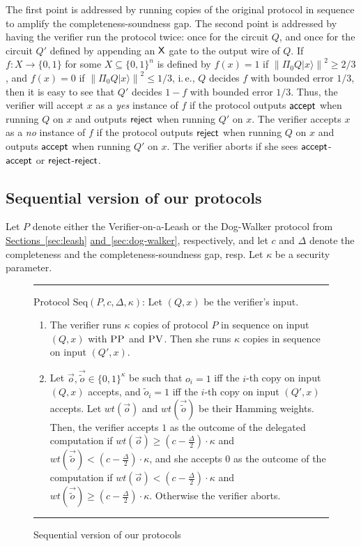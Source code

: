 \documentclass[11pt]{article}
\numberwithin{equation}{section}
\theoremstyle{definition}
\theoremstyle{plain}
\newcommand{\ie}{i.\,e.}
\newcommand{\expref}[2]{\hyperref[#2]{#1~\ref{#2}}}
\newcommand{\ket}[1]{|#1\rangle}
\newcommand{\norm}[1]{\left\|#1\right\|}
\newcommand{\pv}{\textsc{PV}}
\newcommand{\pp}{\textsc{PP}}
\begin{document}
The first point is addressed by running copies of the original protocol in sequence to amplify the completeness-soundness gap. The second point is addressed by having the verifier run the protocol twice: once for the circuit $Q$, and once for the circuit $Q'$ defined by appending an $\sf X$ gate to the output wire of $Q$. If $f:X\rightarrow \{0,1\}$ for some $X\subseteq \{0,1\}^n$ is defined by $f(x)=1$ if $\norm{\Pi_0 Q\ket{x}}^2\geq 2/3$, and $f(x)=0$ if $\norm{\Pi_0 Q\ket{x}}^2\leq 1/3$, \ie, $Q$ decides $f$ with bounded error $1/3$, then it is easy to see that $Q'$ decides $1-f$ with bounded error $1/3$. Thus, the verifier will accept $x$ as a \textit{yes} instance of $f$ if the protocol outputs ${\sf accept}$ when running $Q$ on $x$ and outputs $\sf reject$ when running $Q'$ on $x$. The verifier accepts $x$ as a \textit{no} instance of $f$ if the protocol outputs $\sf reject$ when running $Q$ on $x$ and outputs $\sf accept$ when running $Q'$ on $x$. The verifier aborts if she sees $\sf accept$-$\sf accept$ or $\sf reject$-$\sf reject$. 



\subsection{Sequential version of our protocols}


Let $P$ denote either the %
Verifier-on-a-Leash  %
or the Dog-Walker protocol from \expref{Sections}{sec:leash} \expref{and}{sec:dog-walker}, respectively, %
and let $c$ and $\Delta$ denote the completeness and 
%
the completeness-soundness gap, resp.  %
Let $\kappa$ be a security parameter.

\begin{figure}[H]
%
\rule[1ex]{\textwidth}{0.5pt}  %
\justify
Protocol $\mbox{Seq}(P,c,\Delta, \kappa)$: Let $(Q,x)$ be the verifier's input. 
\begin{enumerate}
\item The verifier runs $\kappa$ copies of protocol $P$ in sequence on input $(Q,x)$ with $\pp$ and $\pv$. Then she runs $\kappa$ copies in sequence on input $(Q',x)$. 
\item Let $\vec{o}, \vec{\tilde{o}} \in \{0,1\}^{\kappa}$ be such that $o_i = 1$ iff the $i$-th copy on input $(Q,x)$ accepts, and $\tilde{o}_i = 1$ iff the $i$-th copy on input $(Q',x)$ accepts. Let $wt(\vec{o})$ and $wt(\vec{\tilde{o}})$ be their Hamming weights. Then, the verifier accepts $1$ as the outcome of the delegated computation if $wt(\vec{o}) \geq (c- \frac{\Delta}{2}) \cdot \kappa$ and $wt(\vec{\tilde{o}}) < (c- \frac{\Delta}{2}) \cdot \kappa$, and she accepts $0$ as the outcome of the computation if $wt(\vec{o}) < (c- \frac{\Delta}{2})\cdot \kappa$ and $wt(\vec{\tilde{o}}) \geq (c- \frac{\Delta}{2}) \cdot \kappa$. Otherwise the verifier aborts.

\end{enumerate}
%
\rule[2ex]{\textwidth}{0.5pt} \vspace{-.5cm}  %
\caption{Sequential version of our protocols} \label{fig: gardenhose-protocol-parallel}
\end{figure}
\end{document}

